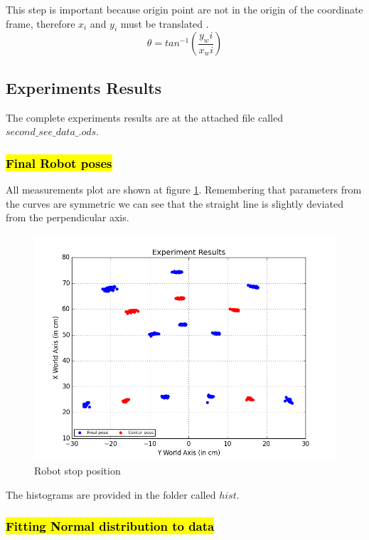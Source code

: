 \documentclass[10pt]{scrartcl}
\begin{document}
\normalsize
This step is important because origin point are not in the origin of the coordinate frame, therefore $x_i$ and $y_i$ must be translated .
	\[
	\theta = tan^{-1}\left(\frac{y_wi}{x_wi}\right)
	\]

\subsection*{Experiments Results}

The complete experiments results are at the attached file called $second\_see \_data\_.ods$.\\
\subsubsection*{\hl{Final Robot poses}}

All measurements plot are shown at figure \ref{fig:10}. Remembering that parameters from the curves are symmetric we can see that the straight line is slightly deviated from the perpendicular axis.\\

\begin{figure}[H]
\centering
\includegraphics[scale=0.70]{images/robot_pose}
\caption{Robot stop position}
\label{fig:10}
\end{figure}

The histograms are provided in the folder called $hist$.


\subsubsection*{\hl{Fitting Normal distribution to data}}
\end{document}

